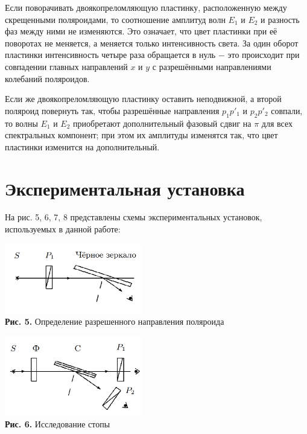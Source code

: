 \documentclass[a4paper,12pt]{article} %
\begin{document}
\hfill \break Если поворачивать двоякопреломляющую пластинку, расположенную между скрещенными поляроидами, то соотношение амплитуд волн $ E_1 $ и $ E_2 $ и разность фаз между ними не изменяются. Это означает, что цвет пластинки при её поворотах не меняется, а меняется только интенсивность света. За один оборот пластинки интенсивность четыре раза обращается в нуль $-$ это происходит при совпадении главных направлений $ x $ и $ y $ с разрешёнными направлениями колебаний поляроидов.

\hfill \break Если же двоякопреломляющую пластинку оставить неподвижной, а второй поляроид повернуть так, чтобы разрешённые направления $ p_1p'_1 $ и $ p_2p'_2 $ совпали, то волны $ E_1 $ и $ E_2 $ приобретают дополнительный фазовый сдвиг на $ \pi $ для всех спектральных компонент; при этом их амплитуды изменятся так, что цвет пластинки изменится на дополнительный. 

\section{Экспериментальная установка}
\hfill \break На рис. 5, 6, 7, 8 представлены схемы экспериментальных установок, используемых в данной работе:	

\begin{center}
\includegraphics[width=0.45\textwidth]{4.7.3_5.png}\\
\textbf{Рис. 5.} Определение разрешенного направления поляроида \\
\end{center}

\begin{center}
\includegraphics[width=0.45\textwidth]{4.7.3_6.png}\\
\textbf{Рис. 6.} Исследование стопы \\
\end{center}
\end{document}
